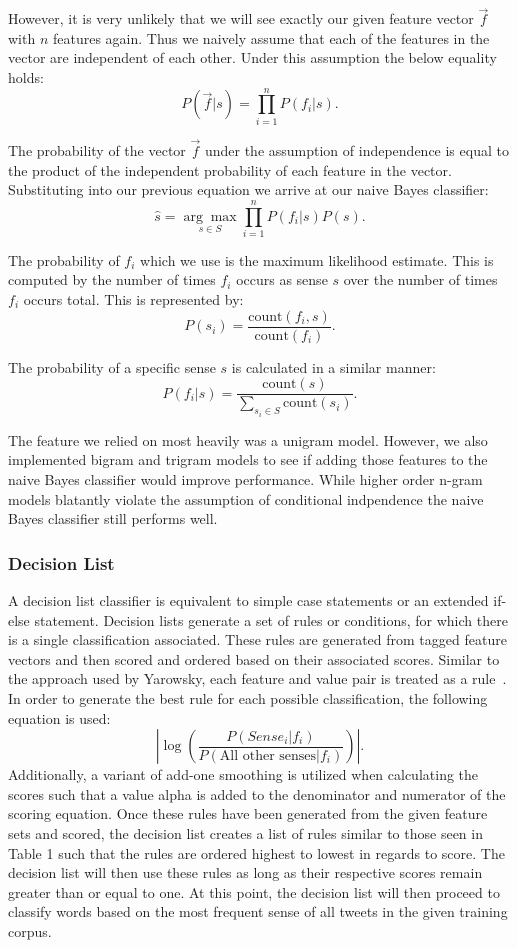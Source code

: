 \documentclass[11pt]{article}
\newcommand{\cou}{\textrm{count}}
\begin{document}
However, it is very unlikely that we will see exactly our given feature vector $\vec{f}$ with $n$ features again. Thus we naively assume that each of the features in the vector are independent of each other. Under this assumption the below equality holds:
\[P(\vec{f}|s) = \prod_{i=1}^n P(f_i|s).\]

The probability of the vector $\vec{f}$ under the assumption of independence is equal to the product of the independent probability of each feature in the vector. Substituting into our previous equation we arrive at our naive Bayes classifier:
\[\hat{s} = \underset{s \in S}{\arg\max}{{\prod_{i=1}^n}P(f_i|s)}P(s).\]

The probability of ${f_i}$ which we use is the maximum likelihood estimate. This is computed by the number of times $f_i$ occurs as sense $s$ over the number of times $f_i$ occurs total. 
This is represented by:
\[P(s_i) = \frac{\cou(f_i,s)}{\cou(f_i)}.\]

The probability of a specific sense $s$ is calculated in a similar manner:
$$P(f_i|s) = \frac{\cou(s)}{\underset{s_i \in S}{\sum} \cou(s_i)}.$$

The feature we relied on most heavily was a unigram model. However, we also implemented bigram and trigram models to see if adding those features to the naive Bayes classifier would improve performance. While higher order n-gram models blatantly violate the assumption of conditional indpendence the naive Bayes classifier still performs well.

\subsubsection*{Decision List}
A decision list classifier is equivalent to simple case statements or an extended if-else statement. Decision lists generate a set of rules or conditions, for which there is a single classification associated. These rules are generated from tagged feature vectors and then scored and ordered based on their associated scores. Similar to the approach used by Yarowsky, each feature and value pair is treated as a rule~\cite{yarowsky1994decision}. In order to generate the best rule for each possible classification, the following equation is used:
\[\left|\log\left({\frac{P(Sense_i|f_i)}{P(\text{All other senses}|f_i)}}\right)\right|.\]
\indent Additionally, a variant of add-one smoothing is utilized when calculating the scores such that a value alpha is added to the denominator and numerator of the scoring equation. Once these rules have been generated from the given feature sets and scored, the decision list creates a list of rules similar to those seen in Table 1 such that the rules are ordered highest to lowest in regards to score. The decision list will then use these rules as long as their respective scores remain greater than or equal to one. At this point, the decision list will then proceed to classify words based on the most frequent sense of all tweets in the given training corpus.
\end{document}
